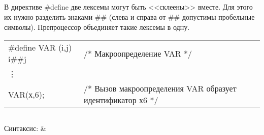 
\subsection{}

В директиве \#define две лексемы могут быть <<склеены>> вместе. Для этого их нужно разделить знаками \#\# (слева и справа от \#\# допустимы пробельные символы). Препроцессор объединяет такие лексемы в одну. \killoverfullbefore \BL

\begin{pExample}
\begin{tabular}{ l l }
\#define VAR (i,j) i\#\#j & \textcolor{exComm}{/* Макроопределение VAR */}  \\
\vdots & \textcolor{exComm}{ } \\
VAR(х,6); & \textcolor{exComm}{/* Вызов макроопределения VAR образует идентификатор х6 */} \\
\end{tabular}
\end{pExample}



\subsection{}

\begin{pHeader}
    Синтаксис:      & \\
\end{pHeader}

